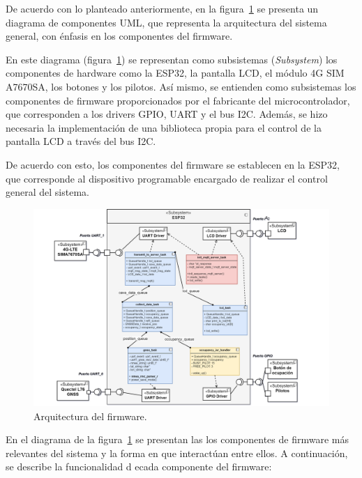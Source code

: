 De acuerdo con lo planteado anteriormente, en la figura~\ref{fig:arq_firmware} se presenta un diagrama de componentes UML, que representa la arquitectura del sistema general, con énfasis en los componentes del firmware. 

En este diagrama (figura~\ref{fig:arq_firmware}) se representan como subsistemas (\textit{Subsystem}) los componentes de hardware como la ESP32, la pantalla LCD, el módulo 4G SIM A7670SA, los botones y los pilotos. Así mismo, se entienden como subsistemas los componentes de firmware proporcionados por el fabricante del microcontrolador, que corresponden a los drivers GPIO, UART y el bus I2C. Además, se hizo necesaria la implementación de una biblioteca propia para el control de la pantalla LCD a través del bus I2C.

De acuerdo con esto, los componentes del firmware se establecen en la ESP32, que corresponde al dispositivo programable encargado de realizar el control general del sistema. 

\begin{figure}[htbp]
	\centering
	\includegraphics[width=1.1\textwidth]{./Figures/Arquitectura_firmware_TFE_GNSS.png}
	\caption{Arquitectura del firmware.}
	\label{fig:arq_firmware}
\end{figure}

En el diagrama de la figura~\ref{fig:arq_firmware} se presentan las los componentes de firmware más relevantes del sistema y la forma en que interactúan entre ellos. A continuación, se describe la funcionalidad d ecada componente del firmware:

